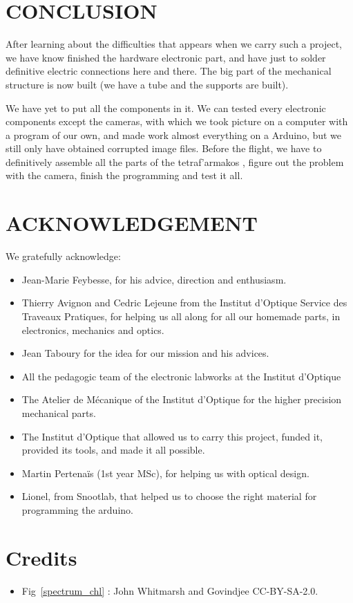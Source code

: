 \documentclass[twocolumn,10pt]{article}
\newcommand\tet{\textgreek{tetraf'armakos} }
\begin{document}
\section{CONCLUSION}
\par After learning about the difficulties that appears when we carry such a project, we have know finished the hardware electronic part, and have just to solder definitive electric connections here and there. The big part of the mechanical structure is now built (we have a tube and the supports are built). 
\par We have yet to put all the components in it. We can tested every electronic components except the cameras, with which we took picture on a computer with a program of our own, and made work almost everything on a Arduino, but we still only have obtained corrupted image files. Before the flight, we have to definitively assemble all the parts of the \tet, figure out the problem with the camera, finish the programming and test it all.
\section*{ACKNOWLEDGEMENT}
We gratefully acknowledge: 
\begin{itemize}
\item Jean-Marie Feybesse, for his advice, direction and enthusiasm.
\item Thierry Avignon and Cedric Lejeune from the Institut d'Optique Service des Traveaux Pratiques, for helping us all along for all our homemade parts, in electronics, mechanics and optics.
\item Jean Taboury for the idea for our mission and his advices.
\item All the pedagogic team of the electronic labworks at the Institut d'Optique
\item The Atelier de Mécanique of the Institut d'Optique for the higher precision mechanical parts.
\item The Institut d'Optique that allowed us to carry this project, funded it, provided its tools, and made it all possible.
\item Martin Pertenaïs (1st year MSc), for helping us with optical design.
\item Lionel, from Snootlab, that helped us to choose the right material for programming the arduino.
\end{itemize}
\section*{Credits}
\begin{itemize}
\item \small Fig~\ref{spectrum_chl} : John Whitmarsh and Govindjee CC-BY-SA-2.0.
\end{itemize}
\end{document}
